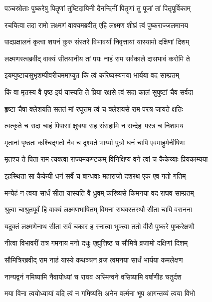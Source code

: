 \twolineshloka
{पञ्चस्रोताः पुष्करेषु पितॄणां तुष्टिदायिनी}
{दैनन्दिनीं पितॄणां तु पूजां तां पितृपूर्विकाम्} %

\twolineshloka
{रचयित्वा तदा रामो लक्ष्मणं वाक्यमब्रवीत्}
{एहि लक्ष्मण शीघ्रं त्वं पुष्कराज्जलमानय} %

\twolineshloka
{पादप्रक्षालनं कृत्वा शयनं कुरु संस्तरे}
{विभावर्यां निवृत्तायां यास्यामो दक्षिणां दिशम्} %

\twolineshloka
{लक्ष्मणस्त्वब्रवीद् वाक्यं सीतयानीय तां पयः}
{नाहं राम सर्वकाले दासभावं करोमि ते} %

\twolineshloka
{इयम्पुष्टाचसुभृशम्पीवरीचममाप्युत}
{किं त्वं करिष्यस्यनया भार्यया वद साम्प्रतम्} %

\twolineshloka
{किं वा मृतस्य वै पृष्ठ इयं यास्यति ते प्रिया}
{रक्षसे त्वं सदा कालं सुपुष्टां चैव सर्वदा} %

\twolineshloka
{हृष्टा चैषा क्लेशयति सततं मां रघूत्तम}
{त्वं च क्लेशयसे राम परत्र जायते क्षतिः} %

\twolineshloka
{त्वत्कृते च सदा चाहं पिपासां क्षुधया सह}
{संसहामि न सन्देहः परत्र च निशामय} %

\twolineshloka
{मृतानां पृष्ठतः कश्चिद्गतो नैव च दृश्यते}
{भार्य्या पुत्रो धनं चापि एवमाहुर्मनीषिणः} %

\twolineshloka
{मृतश्च ते पिता राम त्यक्त्वा राज्यमकण्टकम्}
{विनिक्षिप्य वने त्वां च कैकेय्याः प्रियकाम्यया} %

\twolineshloka
{इहस्थिता सा कैकेयी धनं सर्वे च बान्धवाः}
{महाराजो दशरथ एक एव गतो गतिम्} %

\twolineshloka
{मन्येहं न त्वया सार्धं सीता यास्यति वै ध्रुवम्}
{करिष्यसे किमनया वद राघव साम्प्रतम्} %

\twolineshloka
{श्रुत्वा चाश्रुतपूर्वं हि वाक्यं लक्ष्मणभाषितम्}
{विमना राघवस्तस्थौ सीता चापि वरानना} %

\twolineshloka
{यदुक्तं लक्ष्मणेनाथ सीता सर्वं चकार ह}
{स्नात्वा भुक्त्वा ततो वीरौ पुष्करे पुष्करेक्षणौ} %

\twolineshloka
{नीत्वा विभावरीं तत्र गमनाय मनो दधुः}
{एह्युत्तिष्ठ च सौमित्रे व्रजामो दक्षिणां दिशम्} %

\twolineshloka
{सौमित्रिरब्रवीद् राम नाहं यास्ये कथञ्चन}
{व्रज त्वमनया सार्धं भार्यया कमलेक्षण} %

\twolineshloka
{नान्यद्वनं गमिष्यामि नैवायोध्यां च राघव}
{अस्मिन्वने वसिष्यामि वर्षाणीह चतुर्दश} %

\twolineshloka
{मया विना त्वयोध्यायां यदि त्वं न गमिष्यसि}
{अनेन वर्त्मना भूप आगन्तव्यं त्वया विभो} %

